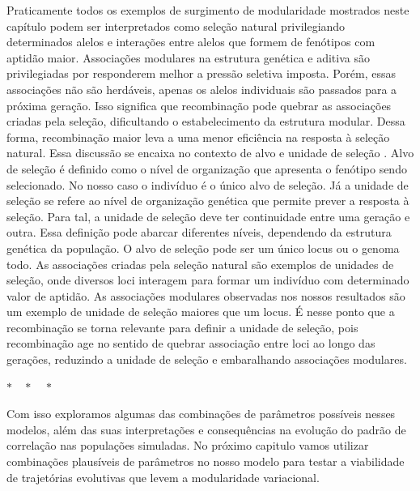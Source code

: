 Praticamente todos os exemplos de surgimento de modularidade mostrados
neste capítulo podem ser interpretados como seleção natural
privilegiando determinados alelos e interações entre alelos que formem
de fenótipos com aptidão maior.
Associações modulares na estrutura genética e aditiva são privilegiadas
por responderem melhor a pressão seletiva imposta.
Porém, essas associações não são herdáveis, apenas os alelos individuais
são passados para a próxima geração.
Isso significa que recombinação pode quebrar as associações criadas pela
seleção, dificultando o estabelecimento da estrutura modular.
Dessa forma, recombinação maior leva a uma menor eficiência na resposta à
seleção natural.
Essa discussão se encaixa no contexto de alvo e unidade de
seleção \citep{Templeton2003}.
Alvo de seleção é definido como o nível de organização que apresenta o
fenótipo sendo selecionado.
No nosso caso o indivíduo é o único alvo de seleção.
Já a unidade de seleção se refere ao nível de organização genética que
permite prever a resposta à seleção.
Para tal, a unidade de seleção deve ter continuidade entre uma geração e
outra.
Essa definição pode abarcar diferentes níveis, dependendo da estrutura
genética da população.
O alvo de seleção pode ser um único locus ou o genoma todo.
As associações criadas pela seleção natural são exemplos de unidades de
seleção, onde diversos loci interagem para formar um indivíduo com
determinado valor de aptidão.
As associações modulares observadas nos nossos resultados são um
exemplo de unidade de seleção maiores que um locus.
É nesse ponto que a recombinação se torna relevante para definir a
unidade de seleção, pois recombinação age no sentido de quebrar
associação entre loci ao longo das gerações, reduzindo a unidade de
seleção e embaralhando associações modulares.

\centerline { $ * \quad * \quad * $ }

Com isso exploramos algumas das combinações de parâmetros possíveis
nesses modelos, além das suas interpretações e consequências na evolução
do padrão de correlação nas populações simuladas.
No próximo capitulo vamos utilizar combinações plausíveis de parâmetros
no nosso modelo para testar a viabilidade de trajetórias evolutivas que
levem a modularidade variacional.

